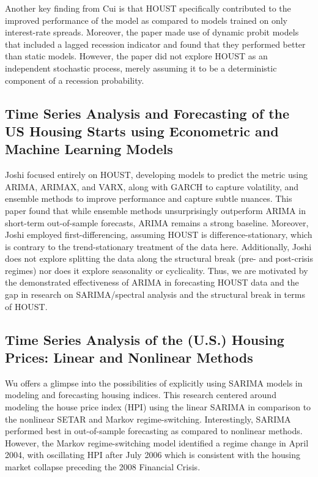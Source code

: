 \documentclass[10pt,twocolumn,letterpaper]{article}
\begin{document}
Another key finding from Cui is that HOUST specifically contributed to the improved performance of the model as compared to models trained on only interest-rate spreads. Moreover, the paper made use of dynamic probit models that included a lagged recession indicator and found that they performed better than static models. However, the paper did not explore HOUST as an independent stochastic process, merely assuming it to be a deterministic component of a recession probability.

\subsection{Time Series Analysis and Forecasting of the US Housing Starts using Econometric and Machine Learning Models}

Joshi \cite{joshi2019timeseriesanalysisforecasting} focused entirely on HOUST, developing models to predict the metric using ARIMA, ARIMAX, and VARX, along with GARCH to capture volatility, and ensemble methods to improve performance and capture subtle nuances. This paper found that while ensemble methods unsurprisingly outperform ARIMA in short-term out-of-sample forecasts, ARIMA remains a strong baseline. Moreover, Joshi employed first-differencing, assuming HOUST is difference-stationary, which is contrary to the trend-stationary treatment of the data here. Additionally, Joshi does not explore splitting the data along the structural break (pre- and post-crisis regimes) nor does it explore seasonality or cyclicality. Thus, we are motivated by the demonstrated effectiveness of ARIMA in forecasting HOUST data and the gap in research on SARIMA/spectral analysis and the structural break in terms of HOUST. 

\subsection{Time Series Analysis of the (U.S.) Housing Prices: Linear and Nonlinear Methods}

Wu \cite{wu2017time} offers a glimpse into the possibilities of explicitly using SARIMA models in modeling and forecasting housing indices. This research centered around modeling the house price index (HPI) using the linear SARIMA in comparison to the nonlinear SETAR and Markov regime-switching. Interestingly, SARIMA performed best in out-of-sample forecasting as compared to nonlinear methods. However, the Markov regime-switching model identified a regime change in April 2004, with oscillating HPI after July 2006 which is consistent with the housing market collapse preceding the 2008 Financial Crisis. 
\end{document}

